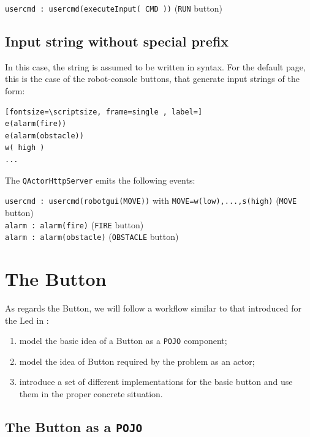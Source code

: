 \indent{     } \texttt{usercmd : usercmd(executeInput( CMD ))}	(\texttt{RUN} button) \\

\subsection{Input string without special prefix} 
In this case, the string is assumed to be written in \prolog{} syntax. For the default page, this is the case of the robot-console buttons, that generate input strings of the form:

\begin{Verbatim}[fontsize=\scriptsize, frame=single , label=]
e(alarm(fire))
e(alarm(obstacle))
w( high )
...
\end{Verbatim}
The  \texttt{QActorHttpServer}  emits the following events:  

\indent{     } \texttt{usercmd : usercmd(robotgui(MOVE))} with \texttt{MOVE=w(low),...,s(high)} (\texttt{MOVE} button) \\
\indent{     } \texttt{alarm   : alarm(fire)}  		(\texttt{FIRE} button) \\
\indent{     } \texttt{alarm   : alarm(obstacle)}		(\texttt{OBSTACLE} button)  
 
 
\newpage 
\section{The Button}

As regards the Button, we will follow a  workflow similar to that introduced for the Led in  :

\begin{enumerate}
\item model the basic idea of a Button as a \texttt{POJO} component;
\item model the idea of Button required by the problem as an actor;
\item introduce a set of different implementations for the basic button and use them in the proper concrete situation.
\end{enumerate}

\subsection{The Button as a \texttt{POJO}}

